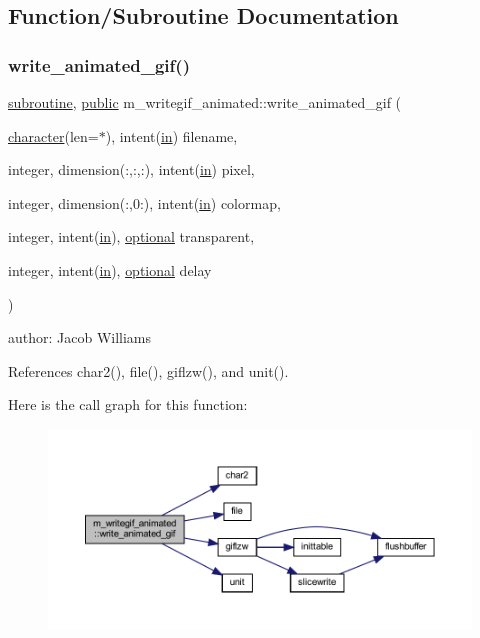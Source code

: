 \subsection{Function/\+Subroutine Documentation}
\mbox{\label{namespacem__writegif__animated_a3da6a5c71a9d9e1f49aa075adc6629bd}} 
\subsubsection{\texorpdfstring{write\+\_\+animated\+\_\+gif()}{write\_animated\_gif()}}
{\footnotesize\ttfamily \hyperlink{M__stopwatch_83_8txt_acfbcff50169d691ff02d4a123ed70482}{subroutine}, \hyperlink{M__stopwatch_83_8txt_a2f74811300c361e53b430611a7d1769f}{public} m\+\_\+writegif\+\_\+animated\+::write\+\_\+animated\+\_\+gif (\begin{DoxyParamCaption}\item[{\hyperlink{option__stopwatch_83_8txt_abd4b21fbbd175834027b5224bfe97e66}{character}(len=$\ast$), intent(\hyperlink{M__journal_83_8txt_afce72651d1eed785a2132bee863b2f38}{in})}]{filename,  }\item[{integer, dimension(\+:,\+:,\+:), intent(\hyperlink{M__journal_83_8txt_afce72651d1eed785a2132bee863b2f38}{in})}]{pixel,  }\item[{integer, dimension(\+:,0\+:), intent(\hyperlink{M__journal_83_8txt_afce72651d1eed785a2132bee863b2f38}{in})}]{colormap,  }\item[{integer, intent(\hyperlink{M__journal_83_8txt_afce72651d1eed785a2132bee863b2f38}{in}), \hyperlink{option__stopwatch_83_8txt_aa4ece75e7acf58a4843f70fe18c3ade5}{optional}}]{transparent,  }\item[{integer, intent(\hyperlink{M__journal_83_8txt_afce72651d1eed785a2132bee863b2f38}{in}), \hyperlink{option__stopwatch_83_8txt_aa4ece75e7acf58a4843f70fe18c3ade5}{optional}}]{delay }\end{DoxyParamCaption})}



author\+: Jacob Williams 



References char2(), file(), giflzw(), and unit().

Here is the call graph for this function\+:
\nopagebreak
\begin{figure}[H]
\begin{center}
\leavevmode
\includegraphics[width=350pt]{namespacem__writegif__animated_a3da6a5c71a9d9e1f49aa075adc6629bd_cgraph}
\end{center}
\end{figure}
